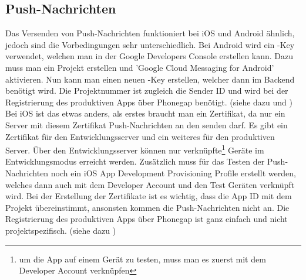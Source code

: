 \subsection{Push-Nachrichten}
Das Versenden von Push-Nachrichten funktioniert bei iOS und Android ähnlich, jedoch sind die Vorbedingungen sehr unterschiedlich. Bei Android wird ein -Key verwendet, welchen man in der Google Developers Console erstellen kann. Dazu muss man ein Projekt erstellen und 'Google Cloud Messaging for Android' aktivieren. Nun kann man einen neuen -Key erstellen, welcher dann im Backend benötigt wird. Die Projektnummer ist zugleich die Sender ID und wird bei der Registrierung des produktiven Apps über Phonegap benötigt. (siehe dazu \cite{android_push_android} und \cite{devgirl_push_android})\\


Bei iOS ist das etwas anders, als erstes braucht man ein Zertifikat, da nur ein Server mit diesem Zertifikat Push-Nachrichten an den  senden darf. Es gibt ein Zertifikat für den Entwicklungsserver und ein weiteres für den produktiven Server. Über den Entwicklungsserver können nur verknüpfte\footnote{um die App auf einem Gerät zu testen, muss man es zuerst mit dem Developer Account verknüpfen} Geräte im Entwicklungsmodus erreicht werden. Zusätzlich muss für das Testen der Push-Nachrichten noch ein iOS App Development Provisioning Profile erstellt werden, welches dann auch mit dem Developer Account und den Test Geräten verknüpft wird. Bei der Erstellung der Zertifikate ist es wichtig, dass die App ID mit dem Projekt übereinstimmt, ansonsten kommen die Push-Nachrichten nicht an. Die Registrierung des produktiven Apps über Phonegap ist ganz einfach und nicht projektspezifisch. (siehe dazu \cite{ios_push})\\

